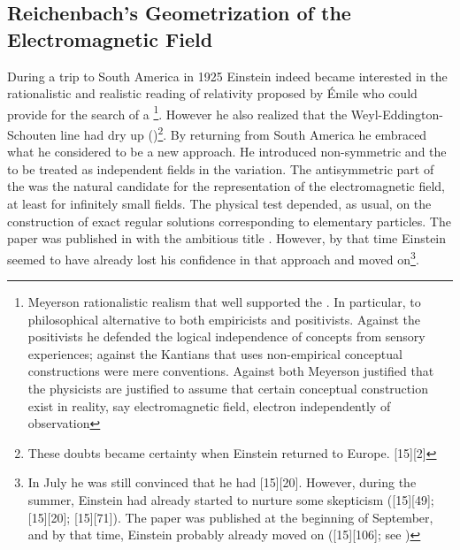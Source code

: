 \documentclass[draft]{article}
\begin{document}
\subsection{Reichenbach's Geometrization of the Electromagnetic Field}
%
During a trip to South America in 1925 Einstein indeed became interested in the rationalistic and realistic reading of relativity proposed by \'Emile   who could provide for the search of a \uft\footnote{Meyerson rationalistic realism that well supported the \uftp. In particular, to philosophical alternative to both empiricists and positivists. Against the positivists he defended the logical independence of concepts from sensory experiences; against the Kantians that uses non-empirical  conceptual constructions were mere conventions. Against both Meyerson justified that the physicists are justified to assume that certain conceptual construction exist in reality, say electromagnetic field, electron independently of observation}. However he also realized that the Weyl-Eddington-Schouten line had dry up ()\footnote{These doubts became certainty when Einstein returned to Europe.  [15][2]}. By returning from South America he embraced what he considered to be a new approach. He introduced non-symmetric \Gtmn and the \gmn to be treated as independent fields in the variation. The antisymmetric part of the \gmn was the natural candidate for the representation of the electromagnetic field, at least for infinitely small fields. The physical test depended, as usual, on the construction of exact regular solutions corresponding to elementary particles. The paper was published in  with the ambitious title   \citep{Einstein1925}. However, by that time Einstein seemed to have already lost his confidence in that approach and moved on\footnote{In July he was still convinced that he had  [15][20]. However, during the summer, Einstein had already started to nurture some skepticism ([15][49]; [15][20]; [15][71]). The paper was published at the beginning of September, and by that time, Einstein probably already moved on ([15][106]; see \cite{Einstein1927c})}.
\end{document}

